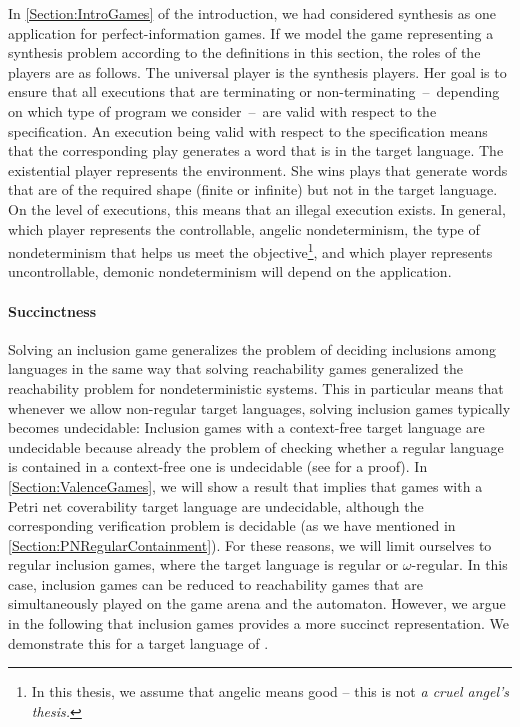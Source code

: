 \documentclass[../../diss.tex]{subfiles}
\begin{document}
In \cref{Section:IntroGames} of the introduction, we had considered synthesis as one application for perfect-information games.
If we model the game representing a synthesis problem according to the definitions in this section, the roles of the players are as follows.
The universal player is the synthesis players.
Her goal is to ensure that all executions that are terminating or non-terminating~--~depending on which type of program we consider~--~are valid with respect to the specification.
An execution being valid with respect to the specification means that the corresponding play generates a word that is in the target language.
The existential player represents the environment.
She wins  plays that generate words that are of the required shape (\ie finite or infinite) but not in the target language.
On the level of executions, this means that an illegal execution exists.
In general, which player represents the controllable, angelic nondeterminism, \ie the type of nondeterminism that helps us meet the objective\footnote{In this thesis, we assume that angelic means good -- this is not \emph{a cruel angel's thesis.}}, and which player represents uncontrollable, demonic nondeterminism will depend on the application.

\paragraph{Succinctness}

Solving an inclusion game generalizes the problem of deciding inclusions among languages in the same way that solving reachability games generalized the reachability problem for nondeterministic systems.
This in particular means that whenever we allow non-regular target languages, solving inclusion games typically becomes undecidable:
Inclusion games with a context-free target language are undecidable because already the problem of checking whether a regular language  is contained in a context-free one is undecidable (see \eg \cite{HopcroftU79} for a proof).
In \cref{Section:ValenceGames}, we will show a result that implies that games with a Petri net coverability target language are undecidable, although the corresponding verification problem is decidable (as we have mentioned in \cref{Section:PNRegularContainment}).
For these reasons, we will limit ourselves to regular inclusion games, where the target language is regular or $\omega$-regular.
In this case, inclusion games can be reduced to reachability games that are simultaneously played on the game arena and the automaton.
However, we argue in the following that inclusion games provides a more succinct representation.
We demonstrate this for a target language of .
\end{document}
